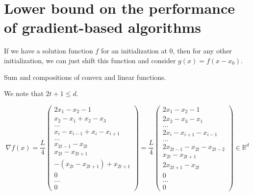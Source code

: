 \documentclass[
10pt, %
a4paper, %
oneside, %
headinclude,footinclude, %
BCOR5mm, %
]{scrartcl}
\title{\normalfont{FTML practical session 14}}
\author{\spacedlowsmallcaps{}
}
\date{\today}
\begin{document}
\renewcommand{\sectionmark}[1]{\markright{\spacedlowsmallcaps{#1}}}
\lehead{\mbox{\llap{\small\thepage\kern1em\color{halfgray} \vline}\color{halfgray}\hspace{0.5em}\rightmark\hfil}} 
\pagestyle{scrheadings}
\maketitle 
\setcounter{tocdepth}{3} 

\section{\large\color{Blue}Lower bound on the performance of gradient-based algorithms}

\exercice{\textbf{}}

If we have a solution function $f$ for an initialization at $0$, then for any other initialization, we can just shift this function and consider $g(x)=f(x-x_0)$.

\exercice{\textbf{}}

Sum and compositions of convex and linear functions.
\\

\exercice{\textbf{}}

 We note that $2t+1\leq d$.

\begin{equation}
    \nabla f(x)
=\frac{L}{4}\begin{pmatrix}
2x_{1}-x_2-1\\
x_2-x_1+x_{2}-x_3\\
...\\
  x_{i}-x_{i-1}+  x_{i}-x_{i+1}\\
...\\
    x_{2t-1}-x_{2t}\\
    x_{2t}-x_{2t+1}\\
    -(x_{2t}-x_{2t+1})+x_{2t+1}\\
0\\
...\\
0
\end{pmatrix}
=\frac{L}{4}\begin{pmatrix}
2x_{1}-x_2-1\\
2x_{2}-x_3-x_1\\
...\\
    2 x_{i}-x_{i+1}-x_{i-1}\\
...\\
   2x_{2t-1}-x_{2t}-x_{2t-2}\\
    x_{2t}-x_{2t+1}\\
    2x_{2t+1}-x_{2t}\\
0\\
...\\
0
\end{pmatrix}
\in \mathbb{R}^d
\end{equation}
\end{document}
